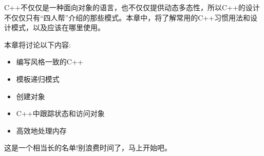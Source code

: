 
C++不仅仅是一种面向对象的语言，也不仅仅提供动态多态性，所以C++的设计不仅仅只有“四人帮”介绍的那些模式。本章中，将了解常用的C++习惯用法和设计模式，以及应该在哪里使用。

本章将讨论以下内容:

\begin{itemize}
\item 编写风格一致的C++
\item 模板递归模式
\item 创建对象
\item C++中跟踪状态和访问对象
\item 高效地处理内存
\end{itemize}

这是一个相当长的名单!别浪费时间了，马上开始吧。
